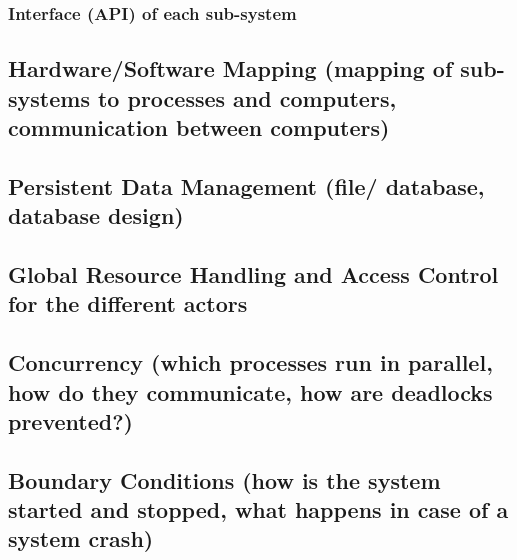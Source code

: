\documentclass{article}
\begin{document}
\subsubsection{Interface (API) of each sub-system}
\subsection{Hardware/Software Mapping (mapping of sub-systems to processes  and 
computers, communication between computers)}
\subsection{Persistent Data Management (file/ database, database design)}
\subsection{Global Resource Handling and Access Control for the different actors}
\subsection{Concurrency (which processes run in parallel, how do they  communicate, 
how are deadlocks prevented?)}
\subsection{Boundary Conditions (how is the system started and stopped, what happens 
in case of a system crash)}
\end{document}
